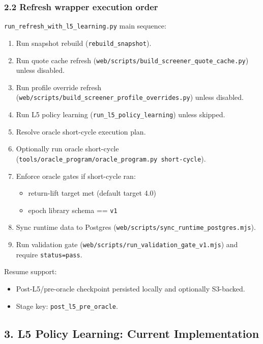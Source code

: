 \documentclass[
]{article}
\providecommand{\tightlist}{%
  \setlength{\itemsep}{0pt}\setlength{\parskip}{0pt}}
\begin{document}
\subsubsection{2.2 Refresh wrapper execution
order}\label{22-refresh-wrapper-execution-order}

\texttt{run\_refresh\_with\_l5\_learning.py} main sequence:

\begin{enumerate}
\def\labelenumi{\arabic{enumi}.}
\tightlist
\item
  Run snapshot rebuild (\texttt{rebuild\_snapshot}).
\item
  Run quote cache refresh
  (\texttt{web/scripts/build\_screener\_quote\_cache.py}) unless
  disabled.
\item
  Run profile override refresh
  (\texttt{web/scripts/build\_screener\_profile\_overrides.py}) unless
  disabled.
\item
  Run L5 policy learning (\texttt{run\_l5\_policy\_learning}) unless
  skipped.
\item
  Resolve oracle short-cycle execution plan.
\item
  Optionally run oracle short-cycle
  (\texttt{tools/oracle\_program/oracle\_program.py\ short-cycle}).
\item
  Enforce oracle gates if short-cycle ran:

  \begin{itemize}
  \tightlist
  \item
    return-lift target met (default target 4.0)
  \item
    epoch library schema == \texttt{v1}
  \end{itemize}
\item
  Sync runtime data to Postgres
  (\texttt{web/scripts/sync\_runtime\_postgres.mjs}).
\item
  Run validation gate
  (\texttt{web/scripts/run\_validation\_gate\_v1.mjs}) and require
  \texttt{status=pass}.
\end{enumerate}

Resume support:

\begin{itemize}
\tightlist
\item
  Post-L5/pre-oracle checkpoint persisted locally and optionally
  S3-backed.
\item
  Stage key: \texttt{post\_l5\_pre\_oracle}.
\end{itemize}

\subsection{3. L5 Policy Learning: Current
Implementation}\label{3-l5-policy-learning-current-implementation}
\end{document}
